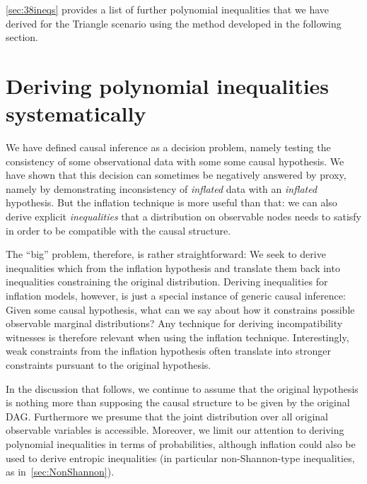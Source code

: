 \cref{sec:38ineqs} provides a list of further polynomial inequalities that we have derived for the Triangle scenario using the method developed in the following section.

\section{Deriving polynomial inequalities systematically}
\label{sec:ineqs}


We have defined causal inference as a decision problem, namely testing the consistency of some observational data with some some causal hypothesis. We have shown that this decision can sometimes be negatively answered by proxy, namely by demonstrating inconsistency of \emph{inflated} data with an \emph{inflated} hypothesis. But the inflation technique is more useful than that: we can also derive explicit \emph{inequalities} that a distribution on observable nodes needs to satisfy in order to be compatible with the causal structure. %

The ``big'' problem, therefore, is rather straightforward: We seek to derive inequalities which from the inflation hypothesis and translate them back into inequalities constraining the original distribution. Deriving inequalities for inflation models, however, is just a special instance of generic causal inference: Given some causal hypothesis, what can we say about how it constrains possible observable marginal distributions? Any technique for deriving incompatibility witnesses is therefore relevant when using the inflation technique. Interestingly, weak constraints from the inflation hypothesis often translate into stronger constraints pursuant to the original hypothesis.

In the discussion that follows, we continue to assume that the original hypothesis is nothing more than supposing the causal structure to be given by the original DAG. Furthermore we presume that the joint distribution over all original observable variables is accessible. Moreover, we limit our attention to deriving polynomial inequalities in terms of probabilities, although inflation could also be used to derive entropic inequalities (in particular non-Shannon-type inequalities, as in~\cref{sec:NonShannon}).

